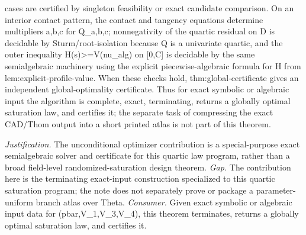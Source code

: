 \documentclass{article}
\begin{document}
cases are certified by singleton feasibility or exact candidate comparison. On an interior contact pattern, the contact and tangency equations determine multipliers a,b,c for Q_{a,b,c}; nonnegativity of the quartic residual on D is decidable by Sturm/root-isolation because Q is a univariate quartic, and the outer inequality H(s)>=V(nu_alg) on [0,C] is decidable by the same semialgebraic machinery using the explicit piecewise-algebraic formula for H from lem:explicit-profile-value. When these checks hold, thm:global-certificate gives an independent global-optimality certificate. Thus for exact symbolic or algebraic input the algorithm is complete, exact, terminating, returns a globally optimal saturation law, and certifies it; the separate task of compressing the exact CAD/Thom output into a short printed atlas is not part of this theorem.
\par\smallskip\noindent \textit{Justification.} The unconditional optimizer contribution is a special-purpose exact semialgebraic solver and certificate for this quartic law program, rather than a broad field-level randomized-saturation design theorem. \textit{Gap.} The contribution here is the terminating exact-input construction specialized to this quartic saturation program; the note does not separately prove or package a parameter-uniform branch atlas over Theta. \textit{Consumer.} Given exact symbolic or algebraic input data for (pbar,V_1,V_3,V_4), this theorem terminates, returns a globally optimal saturation law, and certifies it.
\end{document}
